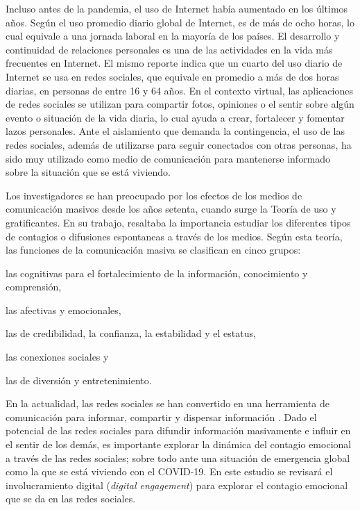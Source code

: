 \documentclass{textolivre}
\begin{document}
Incluso antes de la pandemia, el uso de Internet había aumentado en los últimos años. Según \textcite{kemp2020} el uso promedio diario global de Internet, es de más de ocho horas, lo cual equivale a una jornada laboral en la mayoría de los países. El desarrollo y continuidad de relaciones personales es una de las actividades en la vida más frecuentes en Internet. El mismo reporte indica que un cuarto del uso diario de Internet se usa en redes sociales, que equivale en promedio a más de dos horas diarias, en personas de entre 16 y 64 años. En el contexto virtual, las aplicaciones de redes sociales se utilizan para compartir fotos, opiniones o el sentir sobre algún evento o situación de la vida diaria, lo cual ayuda a crear, fortalecer y fomentar lazos personales. Ante el aislamiento que demanda la contingencia, el uso de las redes sociales, además de utilizarse para seguir conectados con otras personas, ha sido muy utilizado como medio de comunicación para mantenerse informado sobre la situación que se está viviendo. 

Los investigadores se han preocupado por los efectos de los medios de comunicación masivos desde los años setenta, cuando surge la Teoría de uso y gratificantes. En su trabajo, \textcite{mcquail} resaltaba la importancia estudiar los diferentes tipos de contagios o difusiones espontaneas a través de los medios. Según esta teoría, las funciones de la comunicación masiva se clasifican en cinco grupos: 
\begin{enumerate*}[label=\arabic*)] 
\item las cognitivas para el fortalecimiento de la información, conocimiento y comprensión, 
\item las afectivas y emocionales, 
\item las de credibilidad, la confianza, la estabilidad y el estatus, 
\item las conexiones sociales y 
\item las de diversión y entretenimiento.
\end{enumerate*} 
En la actualidad, las redes sociales se han convertido en una herramienta de comunicación para informar, compartir y dispersar información \cite{huttHerrera2012}. Dado el potencial de las redes sociales para difundir información masivamente e influir en el sentir de los demás, es importante explorar la dinámica del contagio emocional a través de las redes sociales; sobre todo ante una situación de emergencia global como la que se está viviendo con el COVID-19. En este estudio se revisará el involucramiento digital (\textit{digital engagement}) para explorar el contagio emocional que se da en las redes sociales. 
\end{document}
